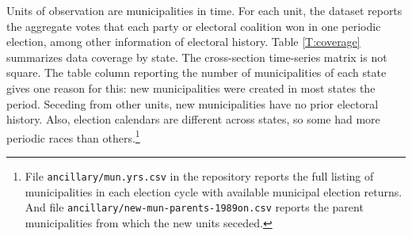 \documentclass[letter,12pt]{article}
\begin{document}
Units of observation are municipalities in time. For each unit, the dataset reports the aggregate votes that each party or electoral coalition won in one periodic election, among other information of electoral history. Table \ref{T:coverage} summarizes data coverage by state. The cross-section time-series matrix is not square. The table column reporting the number of municipalities of each state gives one reason for this: new municipalities were created in most states the period. Seceding from other units, new municipalities have no prior electoral history. Also, election calendars are different across states, so some had more periodic races than others.\footnote{File \verb|ancillary/mun.yrs.csv| in the repository reports the full listing of municipalities in each election cycle with available municipal election returns. And file \verb|ancillary/new-mun-parents-1989on.csv| reports the parent municipalities from which the new units seceded.}
\end{document}
